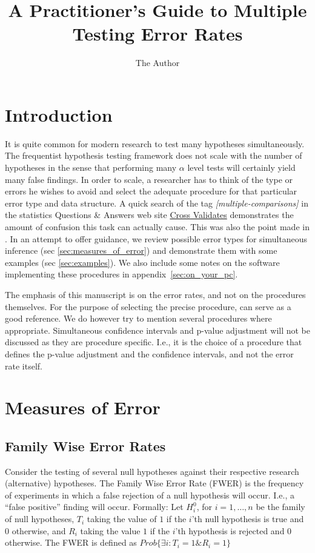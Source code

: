 \documentclass[draft,12pt]{article}
\title{A Practitioner's Guide to Multiple Testing Error Rates}
\author{The Author}
\date{}
\begin{document}
\maketitle


\section{Introduction}

It is quite common for modern research to test many hypotheses simultaneously. The frequentist hypothesis testing framework does not scale with the number of hypotheses in the sense that performing many $\alpha$ level tests will certainly yield many false findings. In order to scale, a researcher has to think of the type or errors he wishes to avoid and select the adequate procedure for that particular error type and data structure. A quick search of the tag \emph{[multiple-comparisons]} in the statistics Questions \& Answers web site \href{http://stats.stackexchange.com}{Cross Validates} demonstrates the amount of confusion this task can actually cause. This was also the point made in \citet[][section 4.4]{benjamini_simultaneous_2010}. 
In an attempt to offer guidance, we review possible error types for simultaneous inference (sec \ref{sec:measures_of_error}) and demonstrate them with some examples (sec \ref{sec:examples}). We also include some notes on the software implementing these procedures in appendix~\ref{sec:on_your_pc}.

The emphasis of this manuscript is on the error rates, and not on the procedures themselves. For the purpose of selecting the precise procedure, \citet{farcomeni_review_2008} can serve as a good reference. We do however try to mention several procedures where appropriate.  Simultaneous confidence intervals and p-value adjustment will not be discussed as they are procedure specific. I.e., it is the choice of a procedure that defines the p-value adjustment and the confidence intervals, and not the error rate itself.


\section{\label{sec:measures_of_error}Measures of Error}

\subsection{Family Wise Error Rates}
Consider the testing of several null hypotheses against their respective research (alternative) hypotheses. The Family Wise Error Rate (FWER) is the frequency of experiments in which a false rejection of a null hypothesis will occur. I.e., a ``false positive'' finding will occur.
Formally: Let $H^0_i$, for $i=1,\ldots,n$ be the family of null hypotheses, $T_i$ taking the value of $1$ if the $i$'th null hypothesis is true and 0 otherwise,  and $R_i$ taking the value $1$ if the $i$'th hypothesis is rejected and 0 otherwise.
The FWER is defined as $Prob\{\exists i:T_i=1 \& R_i=1  \}$
\end{document}
